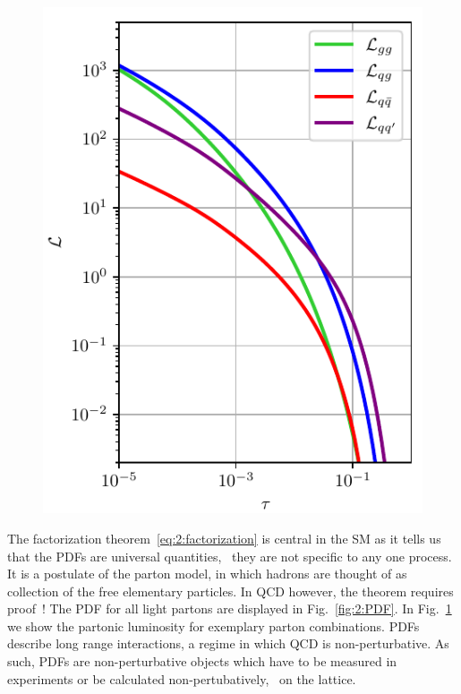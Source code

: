 \begin{figure}[h]
\begin{minipage}[t]{0.48\textwidth}
\centering
\includegraphics[width=\textwidth]{Images/luminosity.pdf}
\label{fig:2:luminosity}
\end{minipage}
\end{figure}

The factorization theorem~\eqref{eq:2:factorization} is central in the \acs{SM} as it tells us that the \acs{PDF}s are universal quantities, \ie\ they are not specific to any one process. It is a postulate of the parton model, in which hadrons are thought of as collection of the free elementary particles. In \acs{QCD} however, the theorem requires proof~\cite{Collins:1989gx}!
The \acs{PDF} for all light partons are displayed in Fig.~\ref{fig:2:PDF}. In Fig.~\ref{fig:2:luminosity} we show the partonic luminosity for exemplary parton combinations. \acs{PDF}s describe long range interactions, a regime in which \acs{QCD} is non-perturbative. As such, \acs{PDF}s are non-perturbative objects which have to be measured in experiments or be calculated non-pertubatively, \eg\ on the lattice.

